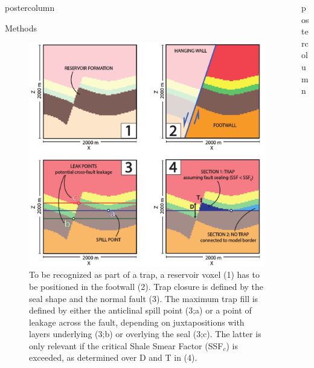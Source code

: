 \documentclass{beamer}
\newlength{\columnheight}
\begin{document}
\begin{frame}
\begin{columns}
\begin{column}{.382\textwidth}
\begin{beamercolorbox}[center]{postercolumn}
\begin{minipage}{.98\textwidth}
{\begin{myblock}{Methods}
							\vspace{0.5em}
							\begin{figure}
								\begin{minipage}{0.8\textwidth}
									\centering\includegraphics[width=1\textwidth]{figures/Trap_Cond_H}
									\caption{To be recognized as part of a trap, a reservoir voxel (1) has
									to be positioned in the	footwall (2). Trap closure is defined by the seal shape and the normal fault (3). The maximum trap fill is defined by either the anticlinal spill point
									(3;a) or a point of leakage across the fault, depending on juxtapositions with layers
									underlying (3;b) or overlying the seal (3;c). The latter is only relevant if the
									critical Shale Smear Factor (SSF$_c$) is exceeded, as determined over D and T in (4).}
									\label{fig:trap_cond}
								\end{minipage}
							\end{figure}
						
\end{myblock}
					
					
		}\end{minipage}\end{beamercolorbox}
	\end{column}



	\begin{column}{.618\textwidth}
		\begin{beamercolorbox}[center]{postercolumn}
			\begin{minipage}{.98\textwidth} %
				\parbox[t][\columnheight]{\textwidth}{ %
					
}
\end{minipage}
\end{beamercolorbox}
\end{column}
\end{columns}
\end{frame}
\end{document}
